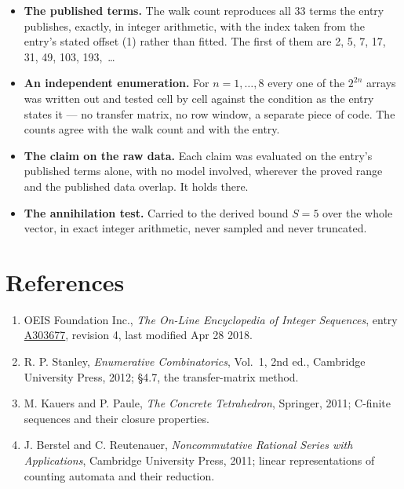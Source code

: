 \documentclass[11pt]{article}
\theoremstyle{definition}
\begin{document}
\begin{itemize}

\item {\bfseries The published terms.} The walk count reproduces all 33 terms the entry publishes, exactly, in integer arithmetic, with the index taken from the entry's stated offset (1) rather than fitted. The first of them are 2, 5, 7, 17, 31, 49, 103, 193,~\dots

\item {\bfseries An independent enumeration.} For $n = 1,\dots,8$ every one of the $2^{2n}$ arrays was written out and tested cell by cell against the condition as the entry states it --- no transfer matrix, no row window, a separate piece of code. The counts agree with the walk count and with the entry.

\item {\bfseries The claim on the raw data.} Each claim was evaluated on the entry's published terms alone, with no model involved, wherever the proved range and the published data overlap. It holds there.

\item {\bfseries The annihilation test.} Carried to the derived bound $S = 5$ over the whole vector, in exact integer arithmetic, never sampled and never truncated.

\end{itemize}

\section{References}

\begin{enumerate}

\item OEIS Foundation Inc., \emph{The On-Line Encyclopedia of Integer Sequences}, entry \href{https://oeis.org/A303677}{A303677}, revision 4, last modified Apr 28 2018.

\item R. P. Stanley, \emph{Enumerative Combinatorics}, Vol.~1, 2nd ed., Cambridge University Press, 2012; \S4.7, the transfer-matrix method.

\item M. Kauers and P. Paule, \emph{The Concrete Tetrahedron}, Springer, 2011; C-finite sequences and their closure properties.

\item J. Berstel and C. Reutenauer, \emph{Noncommutative Rational Series with Applications}, Cambridge University Press, 2011; linear representations of counting automata and their reduction.

\end{enumerate}
\end{document}
